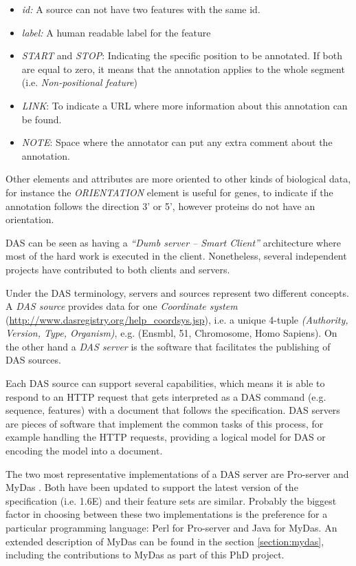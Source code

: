 \begin{itemize}
\setlength\itemsep{-0.3em}
 \item \emph{id:} A source can not have two features with the same id.
 \item \emph{label:} A human readable label for the feature
 \item \emph{START} and \emph{STOP}: Indicating the specific position to be annotated. If both are equal to zero, it means that the annotation applies to the whole segment (i.e. \emph{Non-positional feature})
 \item \emph{LINK}: To indicate a URL where more information about this annotation can be found.
 \item \emph{NOTE}: Space where the annotator can put any extra comment about the annotation.
\end{itemize}

Other elements and attributes are more oriented to other kinds of biological data, for instance the \emph{ORIENTATION} element is useful for genes, to indicate if the annotation follows the direction 3' or 5', however proteins do not have an orientation.

DAS can be seen as having a \emph{``Dumb server -- Smart Client''} architecture where most of the hard work is executed in the client. Nonetheless, several independent projects have contributed to both clients and servers. 

Under the DAS terminology, servers and sources represent two different concepts. A \emph{DAS source} provides data for one \emph{Coordinate system} (\url{http://www.dasregistry.org/help_coordsys.jsp}), i.e. a unique 4-tuple \emph{(Authority, Version, Type, Organism)}, e.g. (Ensmbl, 51, Chromosome, Homo Sapiens). On the other hand a \emph{DAS server} is the software that facilitates the publishing of DAS sources.

Each DAS source can support several capabilities, which means it is able to respond to an HTTP request that gets interpreted as a DAS command (e.g. sequence, features) with a document that follows the specification. DAS servers are pieces of software that implement the common tasks of this process, for example handling the HTTP requests, providing a logical model for DAS or encoding the model into a document.

The two most representative implementations of a DAS server are Pro-server \cite{FIN2007} and MyDas \cite{SAL2012}. Both have been updated to support the latest version of the specification (i.e. 1.6E) and their feature sets are similar. Probably the biggest factor in choosing between these two implementations is the preference for a particular programming language: Perl for Pro-server and Java for MyDas. An extended description of MyDas can be found in the section \ref{section:mydas}, including the contributions to MyDas as part of this PhD project.


